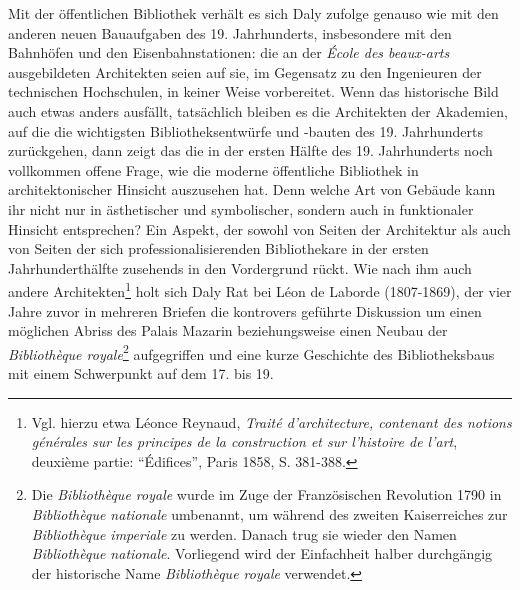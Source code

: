 Mit der öffentlichen Bibliothek verhält es sich Daly zufolge genauso wie
mit den anderen neuen Bauaufgaben des 19. Jahrhunderts, insbesondere mit
den Bahnhöfen und den Eisenbahnstationen: die an der \emph{École des
beaux-arts} ausgebildeten Architekten seien auf sie, im Gegensatz zu den
Ingenieuren der technischen Hochschulen, in keiner Weise vorbereitet.
Wenn das historische Bild auch etwas anders ausfällt, tatsächlich
bleiben es die Architekten der Akademien, auf die die wichtigsten
Bibliotheksentwürfe und -bauten des 19. Jahrhunderts zurückgehen, dann
zeigt das die in der ersten Hälfte des 19. Jahrhunderts noch vollkommen
offene Frage, wie die moderne öffentliche Bibliothek in
architektonischer Hinsicht auszusehen hat. Denn welche Art von Gebäude
kann ihr nicht nur in ästhetischer und symbolischer, sondern auch in
funktionaler Hinsicht entsprechen? Ein Aspekt, der sowohl von Seiten der
Architektur als auch von Seiten der sich professionalisierenden
Bibliothekare in der ersten Jahrhunderthälfte zusehends in den
Vordergrund rückt. Wie nach ihm auch andere Architekten\footnote{Vgl.
  hierzu etwa Léonce Reynaud, \emph{Traité d'architecture, contenant des
  notions générales sur les principes de la construction et sur
  l'histoire de l'art}, deuxième partie: \enquote{Édifices}, Paris 1858,
  S. 381-388.} holt sich Daly Rat bei Léon de Laborde (1807-1869), der
vier Jahre zuvor in mehreren Briefen die kontrovers geführte Diskussion
um einen möglichen Abriss des Palais Mazarin beziehungsweise einen
Neubau der \emph{Bibliothèque royale}\footnote{Die \emph{Bibliothèque
  royale} wurde im Zuge der Französischen Revolution 1790 in
  \emph{Bibliothèque nationale} umbenannt, um während des zweiten
  Kaiserreiches zur \emph{Bibliothèque imperiale} zu werden. Danach trug
  sie wieder den Namen \emph{Bibliothèque nationale}. Vorliegend wird
  der Einfachheit halber durchgängig der historische Name
  \emph{Bibliothèque royale} verwendet.} aufgegriffen und eine kurze
Geschichte des Bibliotheksbaus mit einem Schwerpunkt auf dem 17. bis 19.
